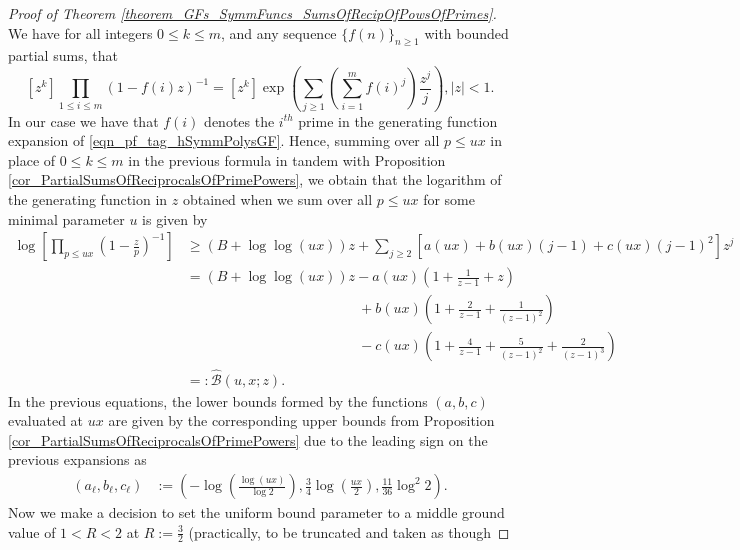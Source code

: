 \documentclass[11pt,reqno,a4letter]{article}
\numberwithin{figure}{section}
\numberwithin{table}{section}
\theoremstyle{plain}
\numberwithin{theorem}{section}
\theoremstyle{definition}
\newcommand{\NBRef}[1]{}
\begin{document}
\NBRef{A06-2020-04-26} 
\begin{proof}[Proof of Theorem \ref{theorem_GFs_SymmFuncs_SumsOfRecipOfPowsOfPrimes}] 
\label{proofOf_theorem_GFs_SymmFuncs_SumsOfRecipOfPowsOfPrimes} 
We have for all integers $0 \leq k \leq m$, and any sequence 
$\{f(n)\}_{n \geq 1}$ with bounded partial sums, that 
\begin{equation} 
\label{eqn_pf_tag_hSymmPolysGF} 
[z^k] \prod_{1 \leq i \leq m} (1-f(i) z)^{-1} = [z^k] \exp\left(\sum_{j \geq 1} 
     \left(\sum_{i=1}^m f(i)^j\right) \frac{z^j}{j}\right), |z| < 1. 
\end{equation} 
In our case we have that $f(i)$ denotes the $i^{th}$ prime in the 
generating function expansion of \eqref{eqn_pf_tag_hSymmPolysGF}. 
Hence, summing over all $p \leq ux$ 
in place of $0 \leq k \leq m$ in the previous formula in tandem with 
Proposition \ref{cor_PartialSumsOfReciprocalsOfPrimePowers}, we obtain that the logarithm of the 
generating function in $z$ obtained when we sum over all $p \leq ux$ for some minimal parameter 
$u$ is given by 
\begin{align*} 
\log\left[\prod_{p \leq ux} \left(1-\frac{z}{p}\right)^{-1}\right] & \geq (B + \log\log (ux)) z + 
     \sum_{j \geq 2} \left[a(ux) + b(ux)(j-1) + c(ux) (j-1)^2\right] z^j \\ 
     & = (B + \log\log (ux)) z - a(ux) \left(1 + \frac{1}{z-1} + z\right) \\ 
     & \phantom{= (B + \log\log (ux)) z\ } + 
     b(ux) \left( 
     1 + \frac{2}{z-1} + \frac{1}{(z-1)^2}\right) \\ 
     & \phantom{= (B + \log\log (ux)) z\ } - 
     c(ux) \left( 
     1 + \frac{4}{z-1} + \frac{5}{(z-1)^2} + \frac{2}{(z-1)^3}\right) \\ 
     & =: \widehat{\mathcal{B}}(u, x; z). 
\end{align*} 
In the previous equations, the lower bounds formed by the functions $(a,b,c)$ 
evaluated at $ux$ are 
given by the corresponding upper bounds from 
Proposition \ref{cor_PartialSumsOfReciprocalsOfPrimePowers} 
due to the leading sign on the previous expansions as 
\begin{align*} 
(a_{\ell}, b_{\ell}, c_{\ell}) & := \left(-\log\left(\frac{\log (ux)}{\log 2}\right), 
     \frac{3}{4} \log\left(\frac{ux}{2}\right), \frac{11}{36} \log^2 2\right). 
\end{align*} 
Now we make a decision to set the uniform bound parameter to a middle ground value of 
$1 < R < 2$ at $R := \frac{3}{2}$ 
(practically, to be truncated and taken as though 

\end{proof}
\end{document}
